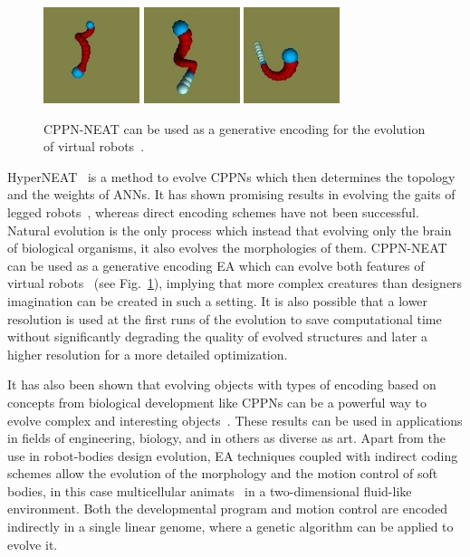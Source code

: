 \begin{figure}[t!]
\centering
\includegraphics[width=0.25\textwidth,height=0.2\textwidth]{../Figures/Misc/auerbach1.png}
\includegraphics[width=0.25\textwidth,height=0.2\textwidth]{../Figures/Misc/auerbach2.png}
\includegraphics[width=0.25\textwidth,height=0.2\textwidth]{../Figures/Misc/auerbach3.png}
\caption{CPPN-NEAT can be used as a generative encoding for the evolution of virtual robots~\citep{auerbach2010dynamic}.}
\label{fig:auerbach}
\end{figure}

HyperNEAT~\citep{stanley2009hypercube} is a method to evolve CPPNs which then determines the topology and the weights of ANNs. It has shown promising results in evolving the gaits of legged robots~\citep{clune2009evolving}, whereas direct encoding schemes have not been successful. Natural evolution is the only process which instead that evolving only the brain of biological organisms, it also evolves the morphologies of them. CPPN-NEAT~\citep{stanley2007compositional} can be used as a generative encoding EA which can evolve both features of virtual robots~\citep{auerbach2010dynamic, auerbach2010evolving} (see Fig.~\ref{fig:auerbach}), implying that more complex creatures than designers imagination can be created in such a setting. It is also possible that a lower resolution is used at the first runs of the evolution to save computational time without significantly degrading the quality of evolved structures and later a higher resolution for a more detailed optimization.

It has also been shown that evolving objects with types of encoding based on concepts from biological development like CPPNs can be a powerful way to evolve complex and interesting objects~\citep{clune2011evolving}. These results can be used in applications in fields of engineering, biology, and in others as diverse as art. Apart from the use in robot-bodies design evolution, EA techniques coupled with indirect coding schemes allow the evolution of the morphology and the motion control of soft bodies, in this case  multicellular animats~\citep{joachimczak2012co} in a two-dimensional fluid-like environment. Both the developmental program and motion control are encoded indirectly in a single linear genome, where a genetic algorithm can be applied to evolve it.

